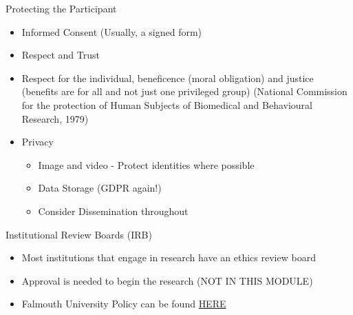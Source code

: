 \begin{frame}{Protecting the Participant}

\begin{itemize}
\item
  Informed Consent (Usually, a signed form)
\item
  Respect and Trust
\item
  Respect for the individual, beneficence (moral obligation) and justice
  (benefits are for all and not just one privileged group) (National
  Commission for the protection of Human Subjects of Biomedical and
  Behavioural Research, 1979)
\item
  Privacy

  \begin{itemize}
  \tightlist
  \item
    Image and video - Protect identities where possible
  \item
    Data Storage (GDPR again!)
  \item
    Consider Dissemination throughout
  \end{itemize}
\end{itemize}

\end{frame}

\begin{frame}{Institutional Review Boards (IRB)}

\begin{itemize}
\tightlist
\item
  Most institutions that engage in research have an ethics review board
\item
  Approval is needed to begin the research (NOT IN THIS MODULE)
\item
  Falmouth University Policy can be found
  \href{https://www.falmouth.ac.uk/sites/default/files/download/research_ethics_policy-13nov15.pdf}{HERE}
\end{itemize}

\end{frame}

